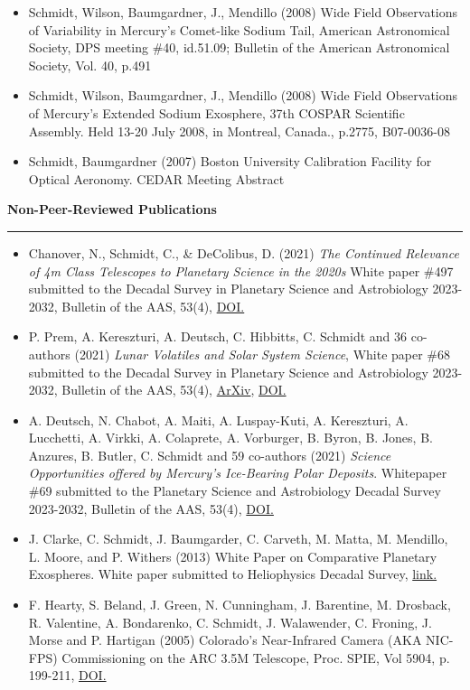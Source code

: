 \documentclass[12pt]{report}
\begin{document}
\begin{itemize}
   \item Schmidt, Wilson, Baumgardner, J., Mendillo (2008) Wide Field Observations of Variability in Mercury's Comet-like Sodium Tail, American Astronomical Society, DPS meeting \#40, id.51.09; Bulletin of the American Astronomical Society, Vol. 40, p.491
   \item Schmidt, Wilson, Baumgardner, J., Mendillo (2008) Wide Field Observations of Mercury's Extended Sodium Exosphere, 37th COSPAR Scientific Assembly. Held 13-20 July 2008, in Montreal, Canada., p.2775, B07-0036-08
   \item Schmidt, Baumgardner (2007) Boston University Calibration Facility for Optical Aeronomy. CEDAR Meeting Abstract
  \end{itemize}
\vspace{2 mm}

\noindent\bf{Non-Peer-Reviewed Publications}\rm \hspace*{\fill} \\
\rule{\textwidth}{1pt}
 \begin{itemize} \itemsep -2pt %
  \item Chanover, N., Schmidt, C., \& DeColibus, D. (2021) \textit{ The Continued Relevance of 4m Class Telescopes to Planetary Science in the 2020s} White paper \#497 submitted to the Decadal Survey in Planetary Science and Astrobiology 2023-2032, Bulletin of the AAS, 53(4), \href{https://doi.org/10.3847/25c2cfeb.752e4fa4}{DOI.}
  \item P. Prem, A. Kereszturi, A. Deutsch, C. Hibbitts, C. Schmidt and 36 co-authors (2021) \textit{Lunar Volatiles and Solar System Science}, White paper \#68 submitted to the Decadal Survey in Planetary Science and Astrobiology 2023-2032, Bulletin of the AAS, 53(4), \href{https://arxiv.org/ftp/arxiv/papers/2012/2012.06317.pdf}{ArXiv}, \href{https://doi.org/10.3847/25c2cfeb.f62324b8}{DOI.}
  \item A. Deutsch, N. Chabot, A. Maiti, A. Luspay-Kuti, A. Kereszturi, A. Lucchetti, A. Virkki, A. Colaprete, A. Vorburger, B. Byron, B. Jones, B. Anzures, B. Butler, C. Schmidt and 59 co-authors (2021) \textit{Science Opportunities offered by Mercury’s Ice-Bearing Polar Deposits}. Whitepaper \#69 submitted to the Planetary Science and Astrobiology Decadal Survey 2023-2032, Bulletin of the AAS, 53(4), \href{https://doi.org/10.3847/25c2cfeb.98885a8e8}{DOI.} 
  \item J. Clarke, C. Schmidt, J. Baumgarder, C. Carveth, M. Matta, M. Mendillo, L. Moore, and P. Withers (2013) White Paper on Comparative Planetary Exospheres. White paper submitted to Heliophysics Decadal Survey, \href{http://sirius.bu.edu/withers/pppp/pdf/clarkeheiodswp2010.pdf}{link.}
  \item F. Hearty, S. Beland, J. Green, N. Cunningham, J. Barentine, M. Drosback, R. Valentine, A. Bondarenko, C. Schmidt, J. Walawender, C. Froning, J. Morse and P. Hartigan (2005) Colorado's Near-Infrared Camera (AKA NIC-FPS) Commissioning on the ARC 3.5M Telescope, Proc. SPIE, Vol 5904, p. 199-211, \href{https://doi.org/10.1117/12.617593}{DOI.}
  \end{itemize}
\vspace{2 mm}
\end{document}
